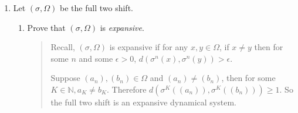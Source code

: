 \documentclass[letter]{article}
\newcommand{\N}{\mathbb{N}}
\newcommand{\mat}[1]{\begin{bmatrix}#1\end{bmatrix}}
\begin{document}
\begin{enumerate}
\begin{enumerate}
\begin{quote}
\begin{equation*}
\begin{aligned}[c]
\begin{tikzpicture}[->,>=stealth',shorten >=1pt,auto,node distance=2cm, thick,main node/.style={circle,draw,font=\Large\bfseries}]
                \path
                (00) edge [loop above] (00);
                
                \path
                (11) edge [bend left] (10)
                (01) edge [bend left] (10)
                (01) edge [bend left] (11)
                (10) edge [bend left] (00)
                (10) edge [bend left] (01)
                (00) edge [bend left] (01)
                ; 
                \end{tikzpicture}  
            \end{aligned}
            \ \ \ \ \ \
            \begin{aligned}[c]
                \mathcal M_G  
                =
                \mat{
                    1& 0& 1& 0 \\
                    1& 0& 1& 0 \\
                    0& 1& 0& 1 \\
                    0& 1& 0& 0  \\
                }
            \end{aligned}
            \ \ \ \ \ \ 
            \begin{aligned}[c]
                \mathcal H(G)
                &= log(|\lambda^*|) \\
                &= log(1.83929) \\
                &= 0.609380...
            \end{aligned}
        \end{equation*}
		\end{quote}
		
		\end{enumerate}
            
        \newpage
		\item Let $(\sigma, \Omega)$ be the full two shift.
		\begin{enumerate}
			\item Prove that $(\sigma, \Omega)$ is \emph{expansive}.
			\begin{quote}
			    Recall, $(\sigma, \Omega)$ is expansive if for any $x, y \in \Omega$,  if $x \neq y$ then for some $n$ and some $\epsilon > 0$, $d(\sigma^n(x), \sigma^n(y)) > \epsilon $.
			    
			     Suppose $(a_n), (b_n) \in  \Omega $ and $(a_n)\neq(b_n)$, then for some $K \in \N,a_K \neq b_K$. Therefore $d(\sigma^K((a_n)), \sigma^K((b_n))) \geq 1$. So the full two shift is an expansive dynamical system.
			\end{quote}
		

\end{enumerate}
\end{enumerate}
\end{document}
